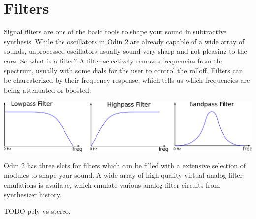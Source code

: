 \chapter{Filters}
\label{filters}
Signal filters are one of the basic tools to shape your sound in subtractive synthesis. While the oscillators in Odin 2 are already capable of a wide array of sounds, unprocessed oscillators usually sound very sharp and not pleasing to the ears. So what is a filter? A filter selectively removes frequencies from the spectrum, usually with some dials for the user to control the rolloff. Filters can be charcaterized by their frequency response, which tells us which frequencies are being attenuated or boosted:

\vspace{5mm}
\begin{center}
    \includegraphics[width=\textwidth]{graphics/filter.png}
\end{center}

\vspace{5mm}

Odin 2 has three slots for filters which can be filled with a extensive selection of modules to shape your sound. A wide array of high quality virtual analog filter emulations is availabe, which emulate various analog filter circuits from synthesizer history.

TODO poly vs stereo.


